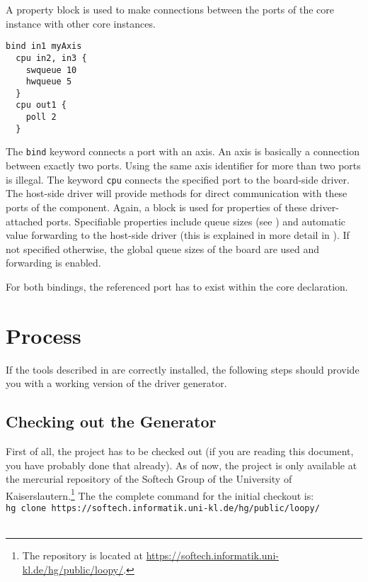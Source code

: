 \documentclass{report}
\begin{document}
A property block is used to make connections between the ports of the core instance with other core instances.

\begin{lstlisting}[language=bdl]
  bind in1 myAxis
  cpu in2, in3 {
    swqueue 10
    hwqueue 5
  }
  cpu out1 {
    poll 2
  }
\end{lstlisting}

The \texttt{bind} keyword connects a port with an axis. An axis is basically a connection between exactly two ports. Using the same axis identifier for more than two ports is illegal.
The keyword \texttt{cpu} connects the specified port to the board-side driver. %
The host-side driver will provide methods for direct communication with these ports of the component.
Again, a block is used for properties of these driver-attached ports. Specifiable properties include queue sizes (see ) and automatic value forwarding to the host-side driver (this is explained in more detail in ). If not specified otherwise, the global queue sizes of the board are used and forwarding is enabled.

For both bindings, the referenced port has to exist within the core declaration.

\section{Process}
\label{sec:process}
If the tools described in  are correctly installed, the following steps should provide you with a working version of the driver generator.


\subsection{Checking out the Generator}
First of all, the project has to be checked out (if you are reading this document, you have probably done that already). As of now, the project is only available at the mercurial repository of the Softech Group of the University of Kaiserslautern.\footnote{The repository is located at \url{https://softech.informatik.uni-kl.de/hg/public/loopy/}.} The the complete command for the initial checkout is:\\

\texttt{hg clone https://softech.informatik.uni-kl.de/hg/public/loopy/\\<target dir>}\\
\end{document}
